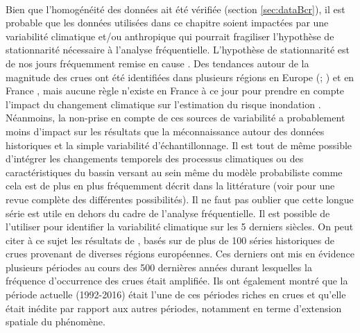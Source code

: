 	\paragraph{} Bien que l'homogénéité des données ait été vérifiée (section \ref{sec:dataBcr}), il est probable que les données utilisées dans ce chapitre soient impactées par une variabilité climatique et/ou anthropique qui pourrait fragiliser l'hypothèse de stationnarité nécessaire à l'analyse fréquentielle. L'hypothèse de stationnarité est de nos jours fréquemment remise en cause \citep{milly_stationarity_2008}. Des tendances autour de la magnitude des crues ont été identifiées dans plusieurs régions en Europe (\citet{hall_understanding_2014}; \citet{bloschl_changing_2019}) et en France \citet{giuntoli_floods_2019}, mais aucune règle n'existe en France à ce jour pour prendre en compte l'impact du changement climatique sur l'estimation du risque inondation \citet{madsen_review_2014}. Néanmoins, la non-prise en compte de ces sources de variabilité a probablement moins d'impact sur les résultats que la méconnaissance autour des données historiques et la simple variabilité d'échantillonnage. Il est tout de même possible d'intégrer les changements temporels des processus climatiques ou des caractéristiques du bassin versant au sein même du modèle probabiliste comme cela est de plus en plus fréquemment décrit dans la littérature (voir \citet{salas_techniques_2018} pour une revue complète des différentes possibilités). Il ne faut pas oublier que cette longue série est utile en dehors du cadre de l'analyse fréquentielle. Il est possible de l'utiliser pour identifier la variabilité climatique sur les 5 derniers siècles. On peut citer à ce sujet les résultats de \citet{bloschl_current_2020}, basés sur de plus de 100 séries historiques de crues provenant de diverses régions européennes. Ces derniers ont mis en évidence plusieurs périodes au cours des 500 dernières années durant lesquelles la fréquence d'occurrence des crues était amplifiée. Ils ont également montré que la période actuelle (1992-2016) était l'une de ces périodes riches en crues et qu'elle était inédite par rapport aux autres périodes, notamment en terme d'extension spatiale du phénomène. 
	
	
